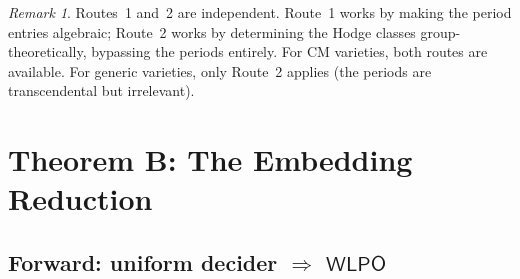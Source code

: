 \documentclass[11pt]{article}
\theoremstyle{plain}
\theoremstyle{definition}
\theoremstyle{remark}
\newtheorem{remark}[theorem]{Remark}
\newcommand{\WLPO}{\ensuremath{\mathsf{WLPO}}}
\begin{document}
\begin{remark}
Routes~1 and~2 are independent. Route~1 works by making the period entries algebraic; Route~2 works by determining the Hodge classes group-theoretically, bypassing the periods entirely. For CM varieties, both routes are available. For generic varieties, only Route~2 applies (the periods are transcendental but irrelevant).
\end{remark}


\section{Theorem B: The Embedding Reduction}\label{sec:thmB}

\subsection{Forward: uniform decider $\Rightarrow$ $\WLPO$}
\end{document}
